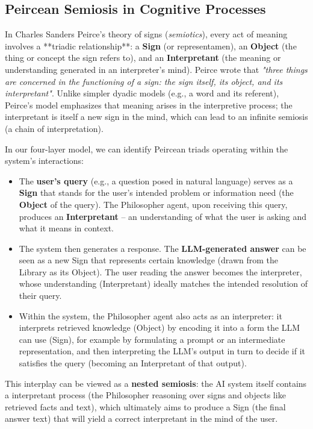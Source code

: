 \documentclass{article}
\begin{document}
\subsection{Peircean Semiosis in Cognitive Processes}
In Charles Sanders Peirce's theory of signs (\emph{semiotics}), every act of meaning involves a **triadic relationship**: a \textbf{Sign} (or representamen), an \textbf{Object} (the thing or concept the sign refers to), and an \textbf{Interpretant} (the meaning or understanding generated in an interpreter's mind). Peirce wrote that \textit{"three things are concerned in the functioning of a sign: the sign itself, its object, and its interpretant"}. Unlike simpler dyadic models (e.g., a word and its referent), Peirce's model emphasizes that meaning arises in the interpretive process; the interpretant is itself a new sign in the mind, which can lead to an infinite semiosis (a chain of interpretation).

In our four-layer model, we can identify Peircean triads operating within the system's interactions:
\begin{itemize}
    \item The \textbf{user's query} (e.g., a question posed in natural language) serves as a \textbf{Sign} that stands for the user's intended problem or information need (the \textbf{Object} of the query). The Philosopher agent, upon receiving this query, produces an \textbf{Interpretant} -- an understanding of what the user is asking and what it means in context.
    \item The system then generates a response. The \textbf{LLM-generated answer} can be seen as a new Sign that represents certain knowledge (drawn from the Library as its Object). The user reading the answer becomes the interpreter, whose understanding (Interpretant) ideally matches the intended resolution of their query.
    \item Within the system, the Philosopher agent also acts as an interpreter: it interprets retrieved knowledge (Object) by encoding it into a form the LLM can use (Sign), for example by formulating a prompt or an intermediate representation, and then interpreting the LLM's output in turn to decide if it satisfies the query (becoming an Interpretant of that output).
\end{itemize}
This interplay can be viewed as a \textbf{nested semiosis}: the AI system itself contains a interpretant process (the Philosopher reasoning over signs and objects like retrieved facts and text), which ultimately aims to produce a Sign (the final answer text) that will yield a correct interpretant in the mind of the user.
\end{document}
